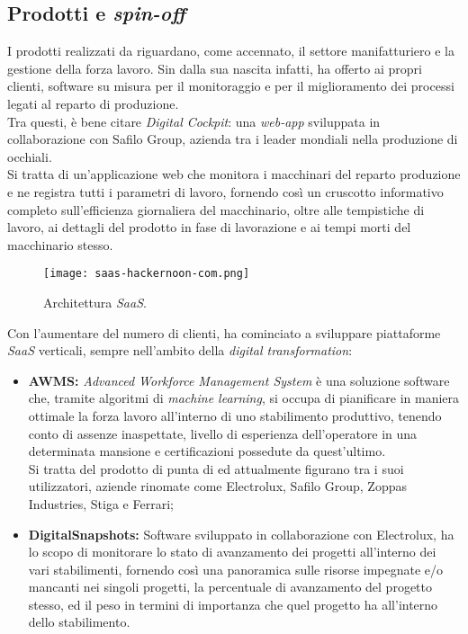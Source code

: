 \subsection{Prodotti e \textit{spin-off}}
I prodotti realizzati da \AD{} riguardano, come accennato, il settore manifatturiero e la gestione della forza lavoro.
Sin dalla sua nascita infatti, \AD{} ha offerto ai propri clienti, software su misura per il monitoraggio e per il miglioramento dei processi legati al reparto di produzione.\\
Tra questi, è bene citare \textit{Digital Cockpit}: una \textit{web-app} sviluppata in collaborazione con Safilo Group, azienda tra i leader mondiali nella produzione di occhiali.\\
Si tratta di un'applicazione web che monitora i macchinari del reparto produzione e ne registra tutti i parametri di lavoro, fornendo così un cruscotto informativo completo sull'efficienza giornaliera del macchinario, oltre alle tempistiche di lavoro, ai dettagli del prodotto in fase di lavorazione e ai tempi morti del macchinario stesso.

\begin{figure}[h]
\texttt{[image: saas-hackernoon-com.png]}
\centering
\caption{Architettura \textit{SaaS}.}
\label{fig:saas}
\end{figure}
Con l'aumentare del numero di clienti, \AD{} ha cominciato a sviluppare piattaforme \textit{SaaS} verticali, sempre nell'ambito della \textit{digital transformation}:
\begin{itemize}
\item \textbf{AWMS:} \textit{Advanced Workforce Management System} è una soluzione software che, tramite algoritmi di \textit{machine learning}, si occupa di pianificare in maniera ottimale la forza lavoro all'interno di uno stabilimento produttivo, tenendo conto di assenze inaspettate, livello di esperienza dell'operatore in una determinata mansione e certificazioni possedute da quest'ultimo. \\
Si tratta del prodotto di punta di \AD{} ed attualmente figurano tra i suoi utilizzatori, aziende rinomate come Electrolux, Safilo Group, Zoppas Industries, Stiga e Ferrari;
\item \textbf{DigitalSnapshots:} Software sviluppato in collaborazione con Electrolux, ha lo scopo di monitorare lo stato di avanzamento dei progetti all'interno dei vari stabilimenti, fornendo così una panoramica sulle risorse impegnate e/o mancanti nei singoli progetti, la percentuale di avanzamento del progetto stesso, ed il peso in termini di importanza che quel progetto ha all'interno dello stabilimento.
\end{itemize}


